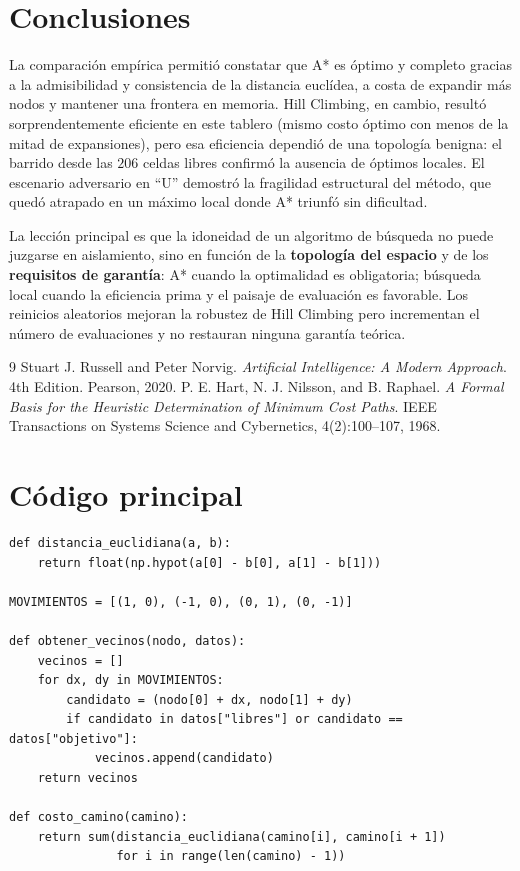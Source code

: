 \documentclass[12pt,a4paper]{article}
\begin{document}
\section{Conclusiones}
\label{sec:conclusiones}

La comparaci\'on emp\'irica permiti\'o constatar que A* es \'optimo y completo gracias a
la admisibilidad y consistencia de la distancia eucl\'idea, a costa de expandir m\'as
nodos y mantener una frontera en memoria. Hill Climbing, en cambio, result\'o
sorprendentemente eficiente en este tablero (mismo costo \'optimo con menos de la mitad
de expansiones), pero esa eficiencia dependi\'o de una topolog\'ia benigna: el barrido
desde las $206$ celdas libres confirm\'o la ausencia de \'optimos locales. El escenario
adversario en ``U'' demostr\'o la fragilidad estructural del m\'etodo, que qued\'o
atrapado en un m\'aximo local donde A* triunf\'o sin dificultad.

La lecci\'on principal es que la idoneidad de un algoritmo de b\'usqueda no puede
juzgarse en aislamiento, sino en funci\'on de la \textbf{topolog\'ia del espacio} y de
los \textbf{requisitos de garant\'ia}: A* cuando la optimalidad es obligatoria; b\'usqueda
local cuando la eficiencia prima y el paisaje de evaluaci\'on es favorable. Los reinicios
aleatorios mejoran la robustez de Hill Climbing pero incrementan el n\'umero de
evaluaciones y no restauran ninguna garant\'ia te\'orica.

\begin{thebibliography}{9}
 Stuart J. Russell and Peter Norvig.
\textit{Artificial Intelligence: A Modern Approach}. 4th Edition. Pearson, 2020.
 P. E. Hart, N. J. Nilsson, and B. Raphael.
\textit{A Formal Basis for the Heuristic Determination of Minimum Cost Paths}.
IEEE Transactions on Systems Science and Cybernetics, 4(2):100--107, 1968.
\end{thebibliography}

\appendix
\section{C\'odigo principal}
\label{anexo:codigo}

\begin{verbatim}
def distancia_euclidiana(a, b):
    return float(np.hypot(a[0] - b[0], a[1] - b[1]))

MOVIMIENTOS = [(1, 0), (-1, 0), (0, 1), (0, -1)]

def obtener_vecinos(nodo, datos):
    vecinos = []
    for dx, dy in MOVIMIENTOS:
        candidato = (nodo[0] + dx, nodo[1] + dy)
        if candidato in datos["libres"] or candidato == datos["objetivo"]:
            vecinos.append(candidato)
    return vecinos

def costo_camino(camino):
    return sum(distancia_euclidiana(camino[i], camino[i + 1])
               for i in range(len(camino) - 1))
\end{verbatim}
\end{document}
